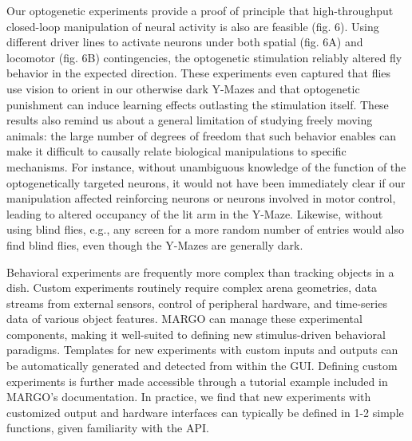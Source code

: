 \documentclass[10pt]{article}
\begin{document}
\begin{multicols}{2}
Our optogenetic experiments provide a proof of principle that high-throughput closed-loop manipulation of neural activity is also are feasible (fig. 6). Using different driver lines to activate neurons under both spatial (fig. 6A) and locomotor (fig. 6B) contingencies, the optogenetic stimulation reliably altered fly behavior in the expected direction. These experiments even captured that flies use vision to orient in our otherwise dark Y-Mazes and that optogenetic punishment can induce learning effects outlasting the stimulation itself. These results also remind us about a general limitation of studying freely moving animals: the large number of degrees of freedom that such behavior enables can make it difficult to causally relate biological manipulations to specific mechanisms. For instance, without unambiguous knowledge of the function of the optogenetically targeted neurons, it would not have been immediately clear if our manipulation affected reinforcing neurons or neurons involved in motor control, leading to altered occupancy of the lit arm in the Y-Maze. Likewise, without using blind flies, e.g., any screen for a more random number of entries would also find blind flies, even though the Y-Mazes are generally dark.

Behavioral experiments are frequently more complex than tracking objects in a dish. Custom experiments routinely require complex arena geometries, data streams from external sensors, control of peripheral hardware, and time-series data of various object features. MARGO can manage these experimental components, making it well-suited to defining new stimulus-driven behavioral paradigms. Templates for new experiments with custom inputs and outputs can be automatically generated and detected from within the GUI. Defining custom experiments is further made accessible through a tutorial example included in MARGO's documentation. In practice, we find that new experiments with customized output and hardware interfaces can typically be defined in 1-2 simple functions, given familiarity with the API.


\end{multicols}
\end{document}
